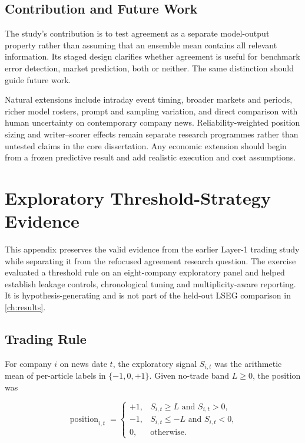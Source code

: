 \documentclass[11pt,a4paper,oneside]{book}
\begin{document}
\section{Contribution and Future Work}
\label{sec:conclusion-future}

The study's contribution is to test agreement as a separate model-output property rather than assuming that an ensemble mean contains all relevant information.
Its staged design clarifies whether agreement is useful for benchmark error detection, market prediction, both or neither.
The same distinction should guide future work.

Natural extensions include intraday event timing, broader markets and periods, richer model rosters, prompt and sampling variation, and direct comparison with human uncertainty on contemporary company news.
Reliability-weighted position sizing and writer--scorer effects remain separate research programmes rather than untested claims in the core dissertation.
Any economic extension should begin from a frozen predictive result and add realistic execution and cost assumptions.




\appendix

\chapter{Exploratory Threshold-Strategy Evidence}
\label{app:exploratory}

This appendix preserves the valid evidence from the earlier Layer-1 trading study while separating it from the refocused agreement research question.
The exercise evaluated a threshold rule on an eight-company exploratory panel and helped establish leakage controls, chronological tuning and multiplicity-aware reporting.
It is hypothesis-generating and is not part of the held-out LSEG comparison in \cref{ch:results}.

\section{Trading Rule}

For company $i$ on news date $t$, the exploratory signal $S_{i,t}$ was the arithmetic mean of per-article labels in $\{-1,0,+1\}$.
Given no-trade band $L\geq0$, the position was

\begin{equation}
  \operatorname{position}_{i,t}=
  \begin{cases}
    +1, & S_{i,t}\geq L \text{ and } S_{i,t}>0,\\
    -1, & S_{i,t}\leq-L \text{ and } S_{i,t}<0,\\
    0,  & \text{otherwise.}
  \end{cases}
\end{equation}
\end{document}
